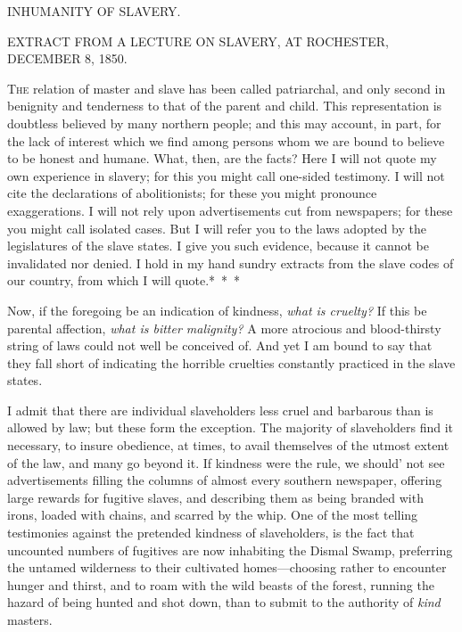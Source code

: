 {\protect\hypertarget{435}{}{}}

{INHUMANITY OF SLAVERY.}

{EXTRACT FROM A LECTURE ON SLAVERY, AT ROCHESTER, DECEMBER 8, 1850.}

\textsc{The} relation of master and slave has been called patriarchal,
and only second in benignity and tenderness to that of the parent and
child. This representation is doubtless believed by many northern
people; and this may account, in part, for the lack of interest which we
find among persons whom we are bound to believe to be honest and humane.
What, then, are the facts? Here I will not quote my own experience in
slavery; for this you might call one-sided testimony. I will not cite
the declarations of abolitionists; for these you might pronounce
exaggerations. I will not rely upon advertisements cut from newspapers;
for these you might call isolated cases. But I will refer you to the
laws adopted by the legislatures of the slave states. I give you such
evidence, because it cannot be invalidated nor denied. I hold in my hand
sundry extracts from the slave codes of our country, from which I will
quote.{*~*~*}

Now, if the foregoing be an indication of kindness, \emph{what is
cruelty?} If this be parental affection, \emph{what is bitter
malignity?} A more atrocious and blood-thirsty string of laws could not
well be conceived of. And yet I am bound to say that they fall short of
indicating the horrible cruelties constantly practiced in the slave
states.

I admit that there are individual slaveholders less cruel and barbarous
than is allowed by law; but these form the exception. The majority of
slaveholders find it necessary, to insure obedience, at times, to avail
themselves of the utmost extent of the law, and many go beyond it. If
kindness were the rule, we should' not see advertisements filling the
columns of almost every southern newspaper, offering large rewards for
fugitive slaves, and describing them as being branded with irons, loaded
with chains, and scarred by the whip. One of the most telling
testimonies against the pretended kindness of slaveholders, is the fact
that uncounted numbers of fugitives are now inhabiting the Dismal Swamp,
preferring the {\protect\hypertarget{436}{}{}}untamed wilderness to
their cultivated homes---choosing rather to encounter hunger and thirst,
and to roam with the wild beasts of the forest, running the hazard of
being hunted and shot down, than to submit to the authority of
\emph{kind} masters.

